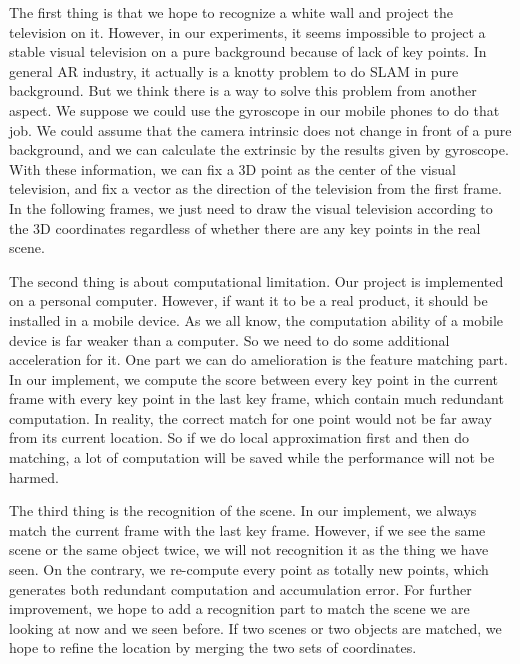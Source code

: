 \documentclass[paper=a4, fontsize=14pt]{scrartcl}
\numberwithin{equation}{section}		%
\numberwithin{figure}{section}			%
\numberwithin{table}{section}				%
\begin{document}
The first thing is that we hope to recognize a white wall and project the television on it. However, in our experiments, it seems impossible to project a stable visual television on a pure background because of lack of key points. In general AR industry, it actually is a knotty problem to do SLAM in pure background. But we think there is a way to solve this problem from another aspect. We suppose we could use the gyroscope in our mobile phones to do that job. We could assume that the camera intrinsic does not change in front of a pure background, and we can calculate the extrinsic by the results given by gyroscope. With these information, we can fix a 3D point as the center of the visual television, and fix a vector as the direction of the television from the first frame. In the following frames, we just need to draw the visual television according to the 3D coordinates regardless of whether there are any key points in the real scene.

The second thing is about computational limitation. Our project is implemented on a personal computer. However, if want it to be a real product, it should be installed in a mobile device. As we all know, the computation ability of a mobile device is far weaker than a computer. So we need to do some additional acceleration for it. One part we can do amelioration is the feature matching part. In our implement, we compute the score between every key point in the current frame with every key point in the last key frame, which contain much redundant computation. In reality, the correct match for one point would not be far away from its current location. So if we do local approximation first and then do matching, a lot of computation will be saved while the performance will not be harmed.

The third thing is the recognition of the scene. In our implement, we always match the current frame with the last key frame. However, if we see the same scene or the same object twice, we will not recognition it as the thing we have seen. On the contrary, we re-compute every point as totally new points, which generates both redundant computation and accumulation error. For further improvement, we hope to add a recognition part to match the scene we are looking at now and we seen before. If two scenes or two objects are matched, we hope to refine the location by merging the two sets of coordinates.

\newpage
\begin{spacing}{1.0}


\end{spacing}

\end{document}

